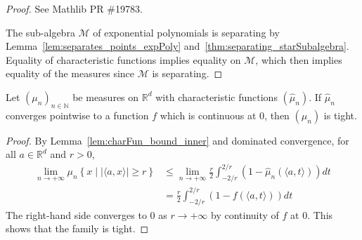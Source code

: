 \begin{proof}\leanok
See Mathlib PR \#19783.

The sub-algebra $\mathcal M$ of exponential polynomials is separating by Lemma~\ref{lem:separates_points_expPoly} and~\ref{thm:separating_starSubalgebra}. Equality of characteristic functions implies equality on $\mathcal M$, which then implies equality of the measures since $\mathcal M$ is separating.
\end{proof}






\begin{lemma}\label{lem:tight_of_tendsto_charFun}
\leanok
{}
Let $(\mu_n)_{n \in \mathbb{N}}$ be measures on $\mathbb{R}^d$ with characteristic functions $(\hat{\mu}_n)$. If $\hat{\mu}_n$ converges pointwise to a function $f$ which is continuous at 0, then $(\mu_n)$ is tight.
\end{lemma}

\begin{proof}
\leanok
By Lemma~\ref{lem:charFun_bound_inner} and dominated convergence, for all $a \in \mathbb{R}^d$ and $r > 0$,
\begin{align*}
    \lim_{n \to +\infty} \mu_n \left\{x \mid |\langle a, x\rangle| \ge r\right\}
    &\le \lim_{n \to +\infty} \frac{r}{2} \int_{-2/r}^{2/r} (1 - \hat{\mu}_n(\langle a, t\rangle))dt
    \\
    &= \frac{r}{2} \int_{-2/r}^{2/r} (1 - f(\langle a, t\rangle))dt
\end{align*}
The right-hand side converges to 0 as $r \to +\infty$ by continuity of $f$ at 0.
This shows that the family is tight.
\end{proof}

